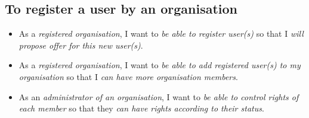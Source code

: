 \subsection{To register a user by an organisation}
\begin{itemize}
    \item As a \textit{registered organisation}, I want to \textit{be able to register user(s)} so that I \textit{will propose offer for this new user(s)}.
    \item As a \textit{registered organisation}, I want to \textit{be able to add registered user(s) to my organisation} so that I \textit{can have more organisation members}.
    \item As an \textit{administrator of an organisation}, I want to \textit{be able to control rights of each member} so that they \textit{can have rights according to their status}.
\end{itemize}

